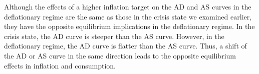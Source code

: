\documentclass[11pt]{article}
\begin{document}
	Although the effects of a higher inflation target on the AD and AS curves in the deflationary regime are the same as those in the crisis state we examined earlier, they have the opposite equilibrium implications in the deflationary regime. In the crisis state, the AD curve is steeper than the AS curve. However, in the deflationary regime, the AD curve is flatter than the AS curve. Thus, a shift of the AD or AS curve in the same direction leads to the opposite equilibrium effects in inflation and consumption.



\end{document}
